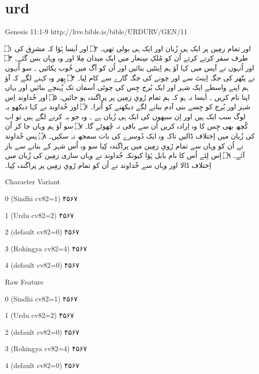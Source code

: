 \documentclass[12pt,fleqn,titlepage,twoside,a4paper]{book}
\begin{document}
\section{urd}

Genesis 11:1-9 http://live.bible.is/bible/URDURV/GEN/11

\begin{arab}[utf]

۝۱ اور تمام زمِین پر ایک ہی زُبان اور ایک ہی بولی تھی۔ ۝۲  اور اَیسا ہُؤا کہ مشرِق کی طرف سفر کرتے کرتے اُن کو مُلکِ سِنعار میں ایک میدان مِلا اور وہ وہاں بس گئے۔ ۝۳ اور اُنہوں نے آپس میں کہا آؤ ہم اِینٹیں بنائیں اور اُن کو آگ میں خُوب پکائیں ۔ سو اُنہوں نے پتّھر کی جگہ اِینٹ سے اور چونے کی جگہ گارے سے کام لِیا۔ ۝۴ پِھر وہ کہنے لگے کہ آؤ ہم اپنے واسطے ایک شہر اور ایک بُرج جِس کی چوٹی آسمان تک پُہنچے بنائیں اور یہاں اپنا نام کریں ۔ اَیسا نہ ہو کہ ہم تمام رُویِ زمِین پر پراگندہ ہو جائیں۔ ۝۵ اور خُداوند اِس شہر اور بُرج کو جِسے بنی آدم بنانے لگے دیکھنے کو اُترا۔ ۝۶ اور خُداوند نے کہا دیکھو یہ لوگ سب ایک ہیں اور اِن سبھوں کی ایک ہی زُبان ہے ۔ وہ جو یہ کرنے لگے ہیں تو اب کُچھ بھی جِس کا وہ اِرادہ کریں اُن سے باقی نہ چُھوٹے گا۔ ۝۷ سو آؤ ہم وہاں جا کر اُن کی زُبان میں اِختلاف ڈالیں تاکہ وہ ایک دُوسرے کی بات سمجھ نہ سکیں۔ ۝۸ پس خُداوند نے اُن کو وہاں سے تمام رُویِ زمِین میں پراگندہ کِیا سو وہ اُس شہر کے بنانے سے باز آئے۔ ۝۹ اِس لِئے اُس کا نام بابل ہُؤا کیونکہ خُداوند نے وہاں ساری زمِین کی زُبان میں اِختلاف ڈالا اور وہاں سے خُداوند نے اُن کو تمام رُویِ زمِین پر پراگندہ کِیا۔


Character Variant

 0 (Sindhi cv82=1)
۴۵۶۷

 1 (Urdu cv82=2)
۴۵۶۷

 2 (default cv82=0)
۴۵۶۷

 3 (Rohingya cv82=4)
۴۵۶۷

 4 (default cv82=0)
۴۵۶۷

Raw Feature

 0 (Sindhi cv82=1)
۴۵۶۷

 1 (Urdu cv82=2)
۴۵۶۷

 2 (default cv82=0)
۴۵۶۷

 3 (Rohingya cv82=4)
۴۵۶۷

 4 (default cv82=0)
۴۵۶۷

\end{arab}
\end{document}
